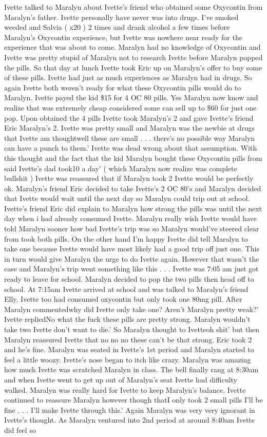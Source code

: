 \documentclass[12pt]{book}
\begin{document}
Ivette talked to Maralyn about Ivette's friend who obtained some Oxycontin from Maralyn's father. Ivette personally have never was into drugs. I've smoked weeded and Salvia ( x20 ) 2 times and drank alcohol a few times before Maralyn's Oxycontin experience, but Ivette was nowhere near ready for the experience that was about to come. Maralyn had no knowledge of Oxycontin and Ivette was pretty stupid of Maralyn not to research Ivette before Maralyn popped the pills. So that day at lunch Ivette took Eric up on Maralyn's offer to buy some of these pills. Ivette had just as much experiences as Maralyn had in drugs. So again Ivette both weren't ready for what these Oxycontin pills would do to Maralyn. Ivette payed the kid \$15 for 4 OC 80 pills. Yes Maralyn now know and realize that was extremely cheap considered some can sell up to \$60 for just one pop. Upon obtained the 4 pills Ivette took Maralyn's 2 and gave Ivette's friend Eric Maralyn's 2. Ivette was pretty small and Maralyn was the newbie at drugs that Ivette am thoughtwell these are small . . .  there's no possible way Maralyn can have a punch to them.' Ivette was dead wrong about that assumption. With this thought and the fact that the kid Maralyn bought these Oxycontin pills from said Ivette's dad took10 a day' ( which Maralyn now realize was complete bullshit ) Ivette was reassured that if Maralyn took 2 Ivette would be perfectly ok. Maralyn's friend Eric decided to take Ivette's 2 OC 80's and Maralyn decided that Ivette would wait until the next day so Maralyn could trip out at school. Ivette's friend Eric did explain to Maralyn how strong the pills was until the next day when i had already consumed Ivette. Maralyn really wish Ivette would have told Maralyn sooner how bad Ivette's trip was so Maralyn would've steered clear from took both pills. On the other hand I'm happy Ivette did tell Maralyn to take one because Ivette would have most likely had a good trip off just one. This in turn would give Maralyn the urge to do Ivette again. However that wasn't the case and Maralyn's trip went something like this . . .  Ivette was 7:05 am just got ready to leave for school. Maralyn decided to pop the two pills then head off to school. At 7:15am Ivette arrived at school and was talked to Maralyn's friend Elly. Ivette too had consumed oxycontin but only took one 80mg pill. After Maralyn commentedwhy did Ivette only take one? Aren't Maralyn pretty weak?' Ivette repliedNo what the fuck these pills are pretty strong. Maralyn wouldn't take two Ivette don't want to die.' So Maralyn thought to Ivetteoh shit' but then Maralyn reassured Ivette that no no no these can't be that strong. Eric took 2 and he's fine. Maralyn was seated in Ivette's 1st period and Maralyn started to feel a little woozy. Ivette's nose began to itch like crazy. Maralyn was amazing how much Ivette was scratched Maralyn in class. The bell finally rang at 8:30am and when Ivette went to get up out of Maralyn's seat Ivette had difficulty walked. Maralyn was really hard for Ivette to keep Maralyn's balance. Ivette continued to reassure Maralyn however though thatI only took 2 small pills I'll be fine . . .  I'll make Ivette through this.' Again Maralyn was very very ignorant in Ivette's thought. As Maralyn ventured into 2nd period at around 8:40am Ivette did feel so 
\end{document}
